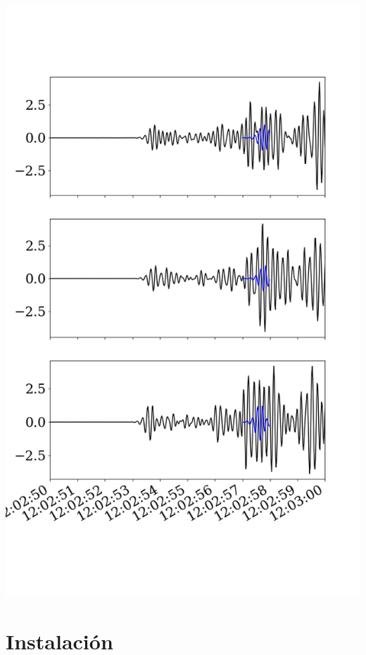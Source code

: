 \documentclass{beamer}
\begin{document}
\begin{frame}
\begin{minipage}{0.4\linewidth}
    \includegraphics[width=1.2\linewidth]{images/fig_7.png}
 \end{minipage}
 
\end{frame}


\section{Instalaci\'on}
\end{document}
